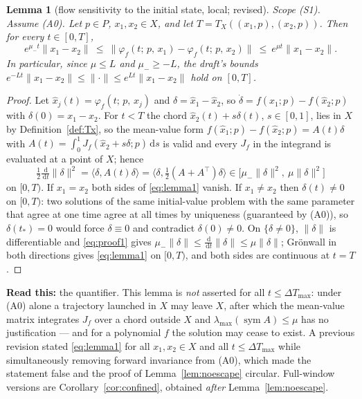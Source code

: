 \documentclass[11pt]{article}
\newtheorem{lemma}{Lemma}
\theoremstyle{remark}\newtheorem{remark}{Remark}
\newcommand{\norm}[1]{\lVert #1\rVert}
\newcommand{\flow}[3]{\varphi_f(#1;\,#2,\,#3)}
\newcommand{\dd}{\,\mathrm{d}}
\newcommand{\readthis}[1]{\textbf{Read this:} #1}
\newcommand{\rev}[1]{\textcolor{blue!55!black}{#1}}
\begin{document}
\begin{lemma}[flow sensitivity to the initial state, local; \rev{revised}]\label{lem:state}
\emph{Scope (S1).} Assume (A0). Let $p\in P$, $x_1,x_2\in X$, and let $T=T_X((x_1,p),(x_2,p))$. Then for every $t\in[0,T]$,
\begin{equation}
e^{\mu_- t}\norm{x_1-x_2}\ \le\ \norm{\flow{t}{p}{x_1}-\flow{t}{p}{x_2}}\ \le\ e^{\mu t}\norm{x_1-x_2}.
\label{eq:lemma1}
\end{equation}
In particular, since $\mu\le L$ and $\mu_-\ge-L$, the draft's bounds $e^{-Lt}\norm{x_1-x_2}\le\norm\cdot\le e^{Lt}\norm{x_1-x_2}$ hold on $[0,T]$.
\end{lemma}
\begin{proof}
Let $\hat x_j(t)=\flow{t}{p}{x_j}$ and $\delta=\hat x_1-\hat x_2$, so $\dot\delta=f(\hat x_1;p)-f(\hat x_2;p)$ with $\delta(0)=x_1-x_2$. For $t<T$ the chord $\hat x_2(t)+s\delta(t)$, $s\in[0,1]$, lies in $X$ by Definition~\ref{def:Tx}, so the mean-value form $f(\hat x_1;p)-f(\hat x_2;p)=A(t)\delta$ with $A(t)=\int_0^1J_f(\hat x_2+s\delta;p)\dd s$ is valid and every $J_f$ in the integrand is evaluated at a point of $X$; hence
\begin{equation}
\tfrac12\tfrac{\dd}{\dd t}\norm\delta^2=\langle\delta,A(t)\delta\rangle
 =\big\langle\delta,\tfrac12(A+A^\top)\delta\big\rangle\in\big[\mu_-\norm\delta^2,\ \mu\norm\delta^2\big]
\label{eq:proof1}
\end{equation}
on $[0,T)$. If $x_1=x_2$ both sides of \eqref{eq:lemma1} vanish. If $x_1\ne x_2$ then $\delta(t)\ne0$ on $[0,T)$: two solutions of the same initial-value problem with the same parameter that agree at one time agree at all times by uniqueness (guaranteed by (A0)), so $\delta(t_\ast)=0$ would force $\delta\equiv0$ and contradict $\delta(0)\ne0$. On $\{\delta\neq0\}$, $\norm\delta$ is differentiable and \eqref{eq:proof1} gives $\mu_-\norm\delta\le\tfrac{\dd}{\dd t}\norm\delta\le\mu\norm\delta$; Gr\"onwall in both directions gives \eqref{eq:lemma1} on $[0,T)$, and both sides are continuous at $t=T$.
\end{proof}
\readthis{the quantifier. This lemma is \emph{not} asserted for all $t\le\Delta T_{\max}$: under (A0) alone a trajectory launched in $X$ may leave $X$, after which the mean-value matrix integrates $J_f$ over a chord outside $X$ and $\lambda_{\max}(\operatorname{sym}A)\le\mu$ has no justification --- and for a polynomial $f$ the solution may cease to exist. A previous revision stated \eqref{eq:lemma1} for all $x_1,x_2\in X$ and all $t\le\Delta T_{\max}$ while simultaneously removing forward invariance from (A0), which made the statement false and the proof of Lemma~\ref{lem:noescape} circular. Full-window versions are Corollary~\ref{cor:confined}, obtained \emph{after} Lemma~\ref{lem:noescape}.}
\end{document}
